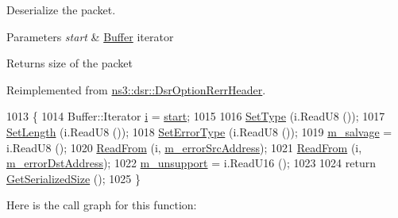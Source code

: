Deserialize the packet. 


\begin{DoxyParams}{Parameters}
{\em start} & \hyperlink{classns3_1_1Buffer}{Buffer} iterator \\
\hline
\end{DoxyParams}
\begin{DoxyReturn}{Returns}
size of the packet 
\end{DoxyReturn}


Reimplemented from \hyperlink{classns3_1_1dsr_1_1DsrOptionRerrHeader_ab8bc84d5e10a371524ed37035db5dbec}{ns3\+::dsr\+::\+Dsr\+Option\+Rerr\+Header}.


\begin{DoxyCode}
1013 \{
1014   Buffer::Iterator \hyperlink{bernuolliDistribution_8m_a6f6ccfcf58b31cb6412107d9d5281426}{i} = \hyperlink{namespacevisualizer_1_1core_a2a35e5d8a34af358b508dac8635754e0}{start};
1015 
1016   \hyperlink{classns3_1_1dsr_1_1DsrOptionHeader_a62b3733f99509fd870ff3ebc9d4513e4}{SetType} (i.ReadU8 ());
1017   \hyperlink{classns3_1_1dsr_1_1DsrOptionHeader_ac13ae881ef80b4c2fce6d59f8aa0fa3e}{SetLength} (i.ReadU8 ());
1018   \hyperlink{classns3_1_1dsr_1_1DsrOptionRerrHeader_a276e77bd18c2df8bee92759f6d789701}{SetErrorType} (i.ReadU8 ());
1019   \hyperlink{classns3_1_1dsr_1_1DsrOptionRerrUnsupportHeader_ae6bc35aab7b428155034234d4f25552b}{m\_salvage} = i.ReadU8 ();
1020   \hyperlink{namespacens3_aeeba9f1570f031f9e401f76f51943805}{ReadFrom} (i, \hyperlink{classns3_1_1dsr_1_1DsrOptionRerrUnsupportHeader_afcf8b2cdc4365f2e44e7f699ef8f4e90}{m\_errorSrcAddress});
1021   \hyperlink{namespacens3_aeeba9f1570f031f9e401f76f51943805}{ReadFrom} (i, \hyperlink{classns3_1_1dsr_1_1DsrOptionRerrUnsupportHeader_a8484a81d9affd2edc99c6ff369b5be24}{m\_errorDstAddress});
1022   \hyperlink{classns3_1_1dsr_1_1DsrOptionRerrUnsupportHeader_a5e4a3590ca429b9adff9b93607e90d2e}{m\_unsupport} = i.ReadU16 ();
1023 
1024   \textcolor{keywordflow}{return} \hyperlink{classns3_1_1dsr_1_1DsrOptionRerrUnsupportHeader_a49bd3dfefecf0c2768d95c71d8afc2d5}{GetSerializedSize} ();
1025 \}
\end{DoxyCode}


Here is the call graph for this function\+:


